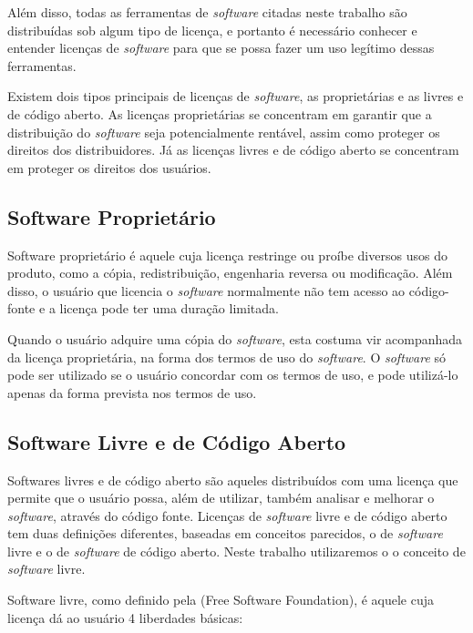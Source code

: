 Além disso, todas as ferramentas de \emph{software} citadas neste trabalho são distribuídas sob algum tipo de licença, e portanto é necessário conhecer e entender licenças de \emph{software} para que se possa fazer um uso legítimo dessas ferramentas.

Existem dois tipos principais de licenças de \emph{software}, as proprietárias e as livres e de código aberto. As licenças proprietárias se concentram em garantir que a distribuição do \emph{software} seja potencialmente rentável, assim como proteger os direitos dos distribuidores. Já as licenças livres e de código aberto se concentram em proteger os direitos dos usuários.

\subsection{Software Proprietário} 

Software proprietário é aquele cuja licença restringe ou proíbe diversos usos do produto, como a cópia, redistribuição, engenharia reversa ou modificação. Além disso, o usuário que licencia o \emph{software} normalmente não tem acesso ao código-fonte e a licença pode ter uma duração limitada.

Quando o usuário adquire uma cópia do \emph{software}, esta costuma vir acompanhada da licença proprietária, na forma dos termos de uso do \emph{software}. O \emph{software} só pode ser utilizado se o usuário concordar com os termos de uso, e pode utilizá-lo apenas da forma prevista nos termos de uso.

\subsection{Software Livre e de Código Aberto}

Softwares livres e de código aberto são aqueles distribuídos com uma licença que permite que o usuário possa, além de utilizar, também analisar e melhorar o \emph{software}, através do código fonte. Licenças de \emph{software} livre e de código aberto tem duas definições diferentes, baseadas em conceitos parecidos, o de \emph{software} livre e o de \emph{software} de código aberto. Neste trabalho utilizaremos o o conceito de \emph{software} livre.

Software livre, como definido pela (Free Software Foundation), é aquele cuja licença dá ao usuário 4 liberdades básicas\cite{GNUFreeSoftware}:

